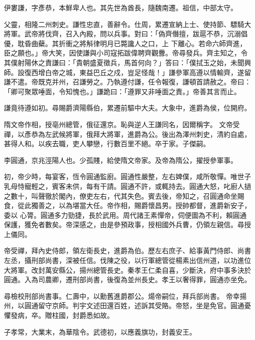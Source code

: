 \begin{pinyinscope}
 伊婁謙，字彥恭，本鮮卑人也。其先世為酋長，隨魏南遷。祖信，中部太守。



 父靈，相隆二州刺史。謙性忠直，善辭令。仕周，累遷宣納上士、使持節、驃騎大將軍。武帝將伐齊，召入內殿，問以兵事。對曰：「偽齊僭擅，跋扈不恭，沉溺倡優，耽昏曲蘗。其折衝之將斛律明月已斃讒人之口，上
 下離心。若命六師齊進，臣之願也。」帝大笑，因使謙與小司寇拓跋偉聘齊觀釁。帝尋發兵。齊主知之，令其僕射陽休之責謙曰：「貴朝盛夏徵兵，馬首何向？」答曰：「僕拭玉之始，未聞興師。設復西增白帝之城，東益巴丘之戍，豈足怪哉！」謙參軍高遵以情輸齊，遂留謙不遣。帝既克并州，召謙勞之。乃執遵付謙，任令報復，謙頓首請赦之。帝曰：「卿可聚眾唾面，令知愧也。」謙跪曰：「遵罪又非唾面之責。」帝善其言而止。



 謙竟待遵如初。尋賜爵濟陽縣伯，累遷前驅中大夫。大象中，進爵為侯，位開府。



 隋文帝作相，授亳州總管，俄征還京。恥與逆人王謙同名，因爾稱字。
 文帝受禪，以彥恭為左武候將軍，俄拜大將軍，進爵為公。後出為澤州刺史，清約自處，甚得人和。以疾去職，吏人攀戀，行數百里不絕。卒于家。子傑嗣。



 李圓通，京兆涇陽人也。少孤賤，給使隋文帝家。及帝為隋公，擢授參軍事。



 初，帝少時，每宴客，恆令圓通監廚。圓通性嚴整，左右婢僕，咸所敬憚。唯世子乳母恃寵輕之，賓客未供，每有干請。圓通不許，或輒持去。圓通大怒，叱廚人撾之數十，叫聲徹於閣內，僚吏左右，代其失色。賓去後，帝知之，召圓通命坐賜食，從此獨善之，以為堪當大任。帝作相，賜爵懷昌男。授帥都督，進爵新安子，委以
 心膂。圓通多力勁捷，長於武用。周代諸王素憚帝，伺便圖為不利，賴圓通保護，獲免者數矣。帝深感之，由是參預政事，授相國外兵曹，仍領左親信。尋授上儀同。



 帝受禪，拜內史侍郎，領左衛長史，進爵為伯。歷左右庶子、給事黃門侍郎、尚書左丞，攝刑部尚書，深被任信。伐陳之役，以行軍總管從楊素出信州道，以功進位大將軍。改封萬安縣公，揚州總管長史。秦孝王仁柔自喜，少斷決，府中事多決於圓通。入為司農卿，遷刑部尚書，後復為並州長史。孝王以奢得罪，圓通亦坐免。



 尋檢校刑部尚書事。仁壽中，以勳舊進爵郡公。煬帝嗣位，拜兵部尚書。
 帝幸揚州，以圓通留守京師。判宇文述田還百姓，述訴其受賂。帝怒，坐是免官。圓通憂懼發病，卒。贈柱國，封爵悉如故。



 子孝常，大業末，為華陰令。武德初，以應義旗功，封義安王。




\end{pinyinscope}
